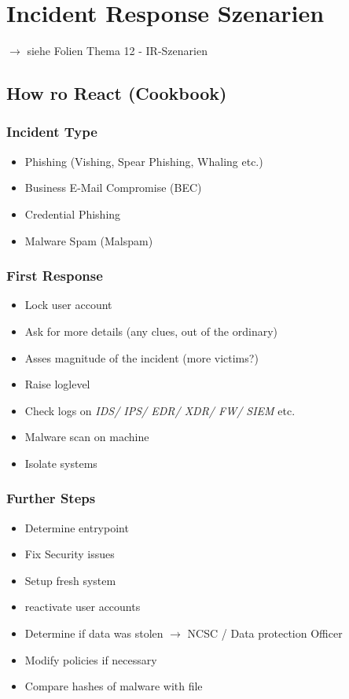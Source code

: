 \section{Incident Response Szenarien}
$\rightarrow$ siehe Folien \glqq Thema 12 - IR-Szenarien\grqq

\subsection{How ro React (Cookbook)}

\subsubsection{Incident Type}
\begin{itemize}
    \item Phishing (Vishing, Spear Phishing, Whaling etc.)
    \item Business E-Mail Compromise (BEC)
    \item Credential Phishing
    \item Malware Spam (Malspam)
\end{itemize}

\subsubsection{First Response}
\begin{itemize}
    \item Lock user account
    \item Ask for more details (any clues, out of the ordinary)
    \item Asses magnitude of the incident (more victims?)
    \item Raise loglevel
    \item Check logs on \textit{IDS/ IPS/ EDR/ XDR/ FW/ SIEM} etc.
    \item Malware scan on machine
    \item Isolate systems
\end{itemize}

\subsubsection{Further Steps}
\begin{itemize}
    \item Determine entrypoint
    \item Fix Security issues
    \item Setup fresh system
    \item reactivate user accounts
    \item Determine if data was stolen $\rightarrow$ NCSC / Data protection Officer
    \item Modify policies if necessary
    \item Compare hashes of malware with file
\end{itemize}